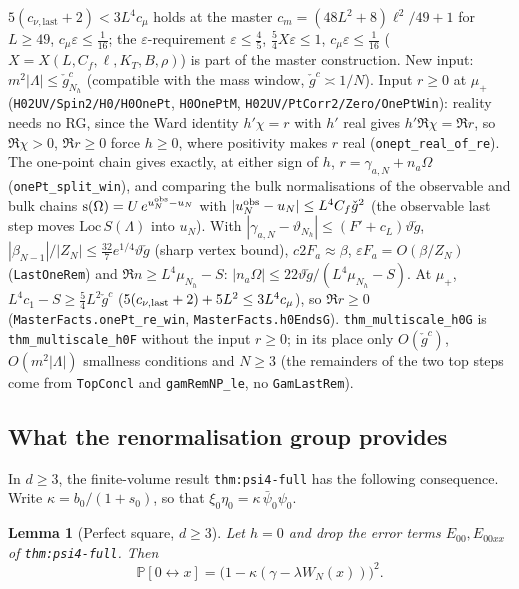 \documentclass[11pt]{amsart}
\newtheorem{lemma}[theorem]{Lemma}
\theoremstyle{definition}
\theoremstyle{remark}
\numberwithin{equation}{section}
\newcommand{\Pb}{\mathbb{P}}
\newcommand{\conn}{\leftrightarrow}
\begin{document}
$5(c_{\nu,\mathrm{last}}+2)<3L^4c_\mu$ holds at the master $c_m=(48L^2+8)\ell^2/49+1$ for $L\ge49$, $c_\mu\varepsilon\le\frac1{16}$; the
$\varepsilon$-requirement $\varepsilon\le\frac45$, $\frac54X\varepsilon\le1$, $c_\mu\varepsilon\le\frac1{16}$ ($X=X(L,C_f,\ell,K_T,B,\rho)$) is part of the
master construction. New input: $m^2|\Lambda|\le\check g^c_{N_h}$ (compatible with the mass window, $\check g^c\asymp1/N$).
Input $r\ge0$ at $\mu_+$ (\texttt{H02UV/Spin2/H0/H0OnePt}, \texttt{H0OnePtM}, \texttt{H02UV/PtCorr2/Zero/OnePtWin}): reality needs no RG, since the
Ward identity $h'\chi=r$ with $h'$ real gives $h'\Re\chi=\Re r$, so $\Re\chi>0$, $\Re r\ge0$ force $h\ge0$, where positivity makes $r$ real
(\texttt{onept\_real\_of\_re}). The one-point chain gives exactly, at either sign of $h$, $r=\gamma_{a,N}+n_a\Omega$ (\texttt{onePt\_split\_win}), and
comparing the bulk normalisations of the observable and bulk chains $\mathrm{s}(\Omega)=U\,e^{u^{\rm obs}_N-u_N}$ with
$|u^{\rm obs}_N-u_N|\le L^4C_f\check g^2$ (the observable last step moves $\mathrm{Loc}\,S(\Lambda)$ into $u_N$). With
$|\gamma_{a,N}-\vartheta_{N_h}|\le(F'+c_L)\vartheta\check g$, $|\beta_{N-1}|/|Z_N|\le\frac{32}7e^{1/4}\vartheta\check g$ (sharp vertex bound),
$c2F_a\approx\beta$, $\varepsilon F_a=O(\beta/Z_N)$ (\texttt{LastOneRem}) and $\Re n\ge L^4\mu_{N_h}-S$: $|n_a\Omega|\le22\vartheta\check g/(L^4\mu_{N_h}-S)$.
At $\mu_+$, $L^4c_1-S\ge\frac54L^2\check g^c$ ($5(c_{\nu,\rm last}+2)+5L^2\le3L^4c_\mu$), so $\Re r\ge0$ (\texttt{MasterFacts.onePt\_re\_win},
\texttt{MasterFacts.h0EndsG}). \texttt{thm\_multiscale\_h0G} is \texttt{thm\_multiscale\_h0F} without the input $r\ge0$; in its place only
$O(\check g^c)$, $O(m^2|\Lambda|)$ smallness conditions and $N\ge3$ (the remainders of the two top steps come from
\texttt{TopConcl} and \texttt{gamRemNP\_le}, no \texttt{GamLastRem}).

\subsection{What the renormalisation group provides}
\label{sec:rgprovides}
In $d\ge3$, the finite-volume result \texttt{thm:psi4-full} has the following consequence.
Write $\kappa=b_0/(1+s_0)$, so that $\xi_0\eta_0=\kappa\,\bar\psi_0\psi_0$.

\begin{lemma}[Perfect square, $d\ge3$]\label{lem:square}
Let $h=0$ and drop the error terms $E_{00},E_{00xx}$ of \texttt{thm:psi4-full}. Then
\[
  \Pb[0\conn x]=\bigl(1-\kappa(\gamma-\lambda W_N(x))\bigr)^2 .
\]
\end{lemma}
\end{document}
